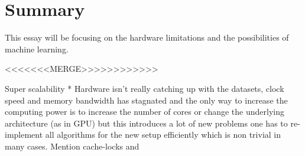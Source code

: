 \documentclass{article}
\begin{document}

\section{Summary} %
    This essay will be focusing on the hardware limitations
    and the possibilities of machine learning.


%
%   
%           
%      
%
%   
%
%
%
%
%
%
<<<<<<<MERGE>>>>>>>>>>>>

    Super scalability
    * Hardware isn't really catching up with the datasets, clock speed and
    memory bandwidth has
    stagnated and the only way to increase the computing power is to increase
    the number of cores or change the underlying architecture (as in GPU) but 
    this introduces a lot of new problems one has to re-implement all
    algorithms for the new setup efficiently which is non trivial in many
    cases. Mention cache-locks and
\end{document}
